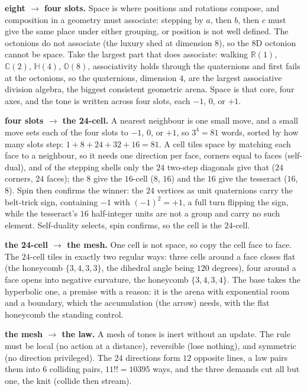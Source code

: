 \documentclass{article}
\begin{document}
\textbf{eight $\to$ four slots.} Space is where positions and rotations compose, and composition
in a geometry must associate: stepping by $a$, then $b$, then $c$ must give the same place under
either grouping, or position is not well defined. The octonions do not associate (the luxury shed
at dimension $8$), so the $8$D octonion cannot be space. Take the largest part that does associate:
walking $\mathbb{R}(1)$, $\mathbb{C}(2)$, $\mathbb{H}(4)$, $\mathbb{O}(8)$, associativity holds
through the quaternions and first fails at the octonions, so the quaternions, dimension $4$, are
the largest associative division algebra, the biggest consistent geometric arena. Space is that
core, four axes, and the tone is written across four slots, each $-1$, $0$, or $+1$.

\textbf{four slots $\to$ the 24-cell.} A nearest neighbour is one small move, and a small move
sets each of the four slots to $-1$, $0$, or $+1$, so $3^4 = 81$ words, sorted by how many slots
step: $1{+}8{+}24{+}32{+}16 = 81$. A cell tiles space by matching each face to a neighbour, so it
needs one direction per face, corners equal to faces (self-dual), and of the stepping shells only
the $24$ two-step diagonals give that ($24$ corners, $24$ faces); the $8$ give the $16$-cell
($8$, $16$) and the $16$ give the tesseract ($16$, $8$). Spin then confirms the winner: the $24$
vertices as unit quaternions carry the belt-trick sign, containing $-1$ with $(-1)^2 = +1$, a full
turn flipping the sign, while the tesseract's $16$ half-integer units are not a group and carry no
such element. Self-duality selects, spin confirms, so the cell is the $24$-cell.

\textbf{the 24-cell $\to$ the mesh.} One cell is not space, so copy the cell face to face. The
$24$-cell tiles in exactly two regular ways: three cells around a face closes flat (the honeycomb
$\{3,4,3,3\}$, the dihedral angle being $120$ degrees), four around a face opens into negative
curvature, the honeycomb $\{3,4,3,4\}$. The base takes the hyperbolic one, a premise with a
reason: it is the arena with exponential room and a boundary, which the accumulation (the arrow)
needs, with the flat honeycomb the standing control.

\textbf{the mesh $\to$ the law.} A mesh of tones is inert without an update. The rule must be
local (no action at a distance), reversible (lose nothing), and symmetric (no direction
privileged). The $24$ directions form $12$ opposite lines, a law pairs them into $6$ colliding
pairs, $11!! = 10395$ ways, and the three demands cut all but one, the knit (collide then stream).
\end{document}
